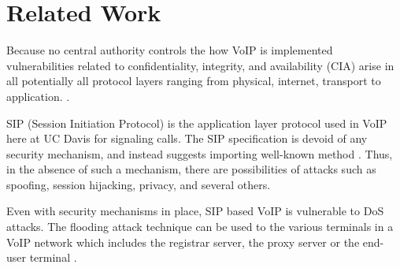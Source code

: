 \section{Related Work}

Because no central authority controls the how VoIP is implemented vulnerabilities related to confidentiality, integrity, and availability (CIA) arise in all potentially all protocol layers ranging from physical, internet, transport to application. \cite{mcgann}. 

SIP (Session Initiation Protocol) is the application layer protocol used in VoIP here at UC Davis for signaling calls. The SIP specification is devoid of any security mechanism, and instead suggests importing well-known method \cite{geneiatakis2006survey}. Thus, in the absence of such a mechanism, there are possibilities of attacks such as spoofing, session hijacking, privacy, and several others.

Even with security mechanisms in place, SIP based VoIP is vulnerable to DoS attacks. The flooding attack technique can be used to the various terminals in a VoIP network which includes the registrar server, the proxy server or the end-user terminal \cite{geneiatakis2006survey}. 